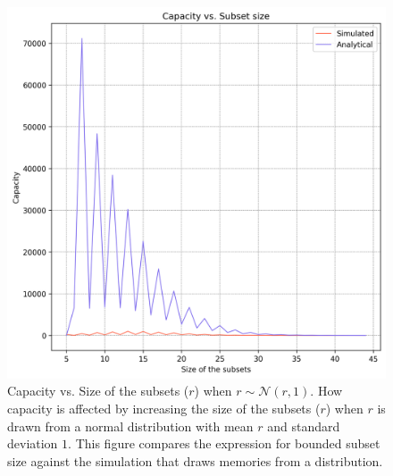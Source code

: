 \begin{figure}%
    \centering
    \includegraphics[scale=0.83]{figures/cap-vs-r-bounded.png}
    \caption[Capacity vs. Size of the subsets ($r$) when $r \sim \mathcal{N}(r,1)$]{Capacity vs. Size of the subsets ($r$) when $r \sim \mathcal{N}(r,1)$. \textmd{How capacity is affected by increasing the size of the subsets ($r$) when $r$ is drawn from a normal distribution with mean $r$ and standard deviation $1$. This figure compares the expression for bounded subset size against the simulation that draws memories from a distribution.}}
    \label{figure:cap-vs-r-bounded}
    \end{figure}

